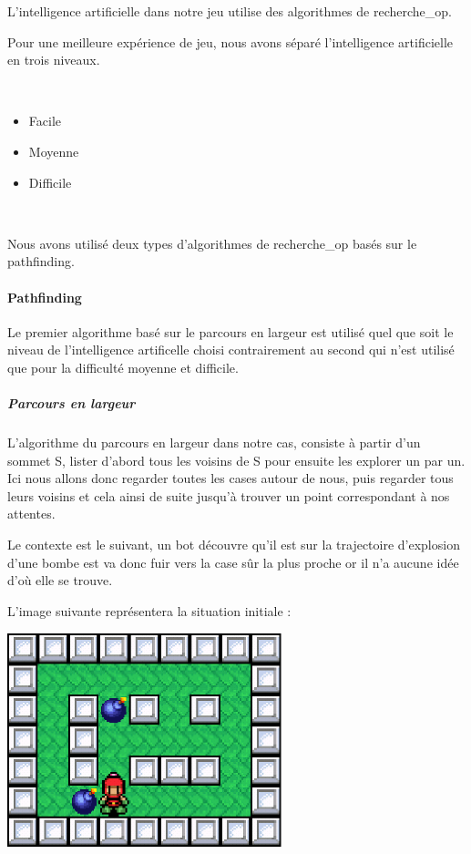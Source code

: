 		L'intelligence artificielle dans notre jeu utilise des algorithmes de \gls{recherche_op}.
		
		Pour une meilleure expérience de jeu, nous avons séparé l'intelligence artificielle en trois niveaux.
		
		$\,$
		
		\begin{itemize}
		  \item Facile
		  \item Moyenne
		  \item Difficile
		\end{itemize}
		
		$\,$
		
		Nous avons utilisé deux types d'algorithmes de \gls{recherche_op} basés sur le \gls{pathfinding}.
		
		\paragraph{Pathfinding}
		
			Le premier algorithme basé sur le parcours en largeur est utilisé quel que soit
			le niveau de l'intelligence artificelle choisi contrairement au second qui n'est utilisé
			que pour la difficulté moyenne et difficile.
		
		\subparagraph{Parcours en largeur\\}
		
			L'algorithme du parcours en largeur dans notre cas, consiste à partir d'un sommet S,
			lister d'abord tous les voisins de S pour ensuite les explorer un par un.
			Ici nous allons donc regarder toutes les cases autour de nous, puis regarder
			tous leurs voisins et cela ainsi de suite jusqu'à trouver un point
			correspondant à nos attentes.
			
			Le contexte est le suivant, un \gls{bot} découvre qu'il est sur la trajectoire
			d'explosion d'une bombe est va donc fuir vers la case sûr la plus proche or
			il n'a aucune idée d'où elle se trouve.
			
			L'image suivante représentera la situation initiale :
			
			\begin{center}
				\includegraphics[width=8cm]{./Analyse/Img/largeur_0.eps}
			\end{center}
			
